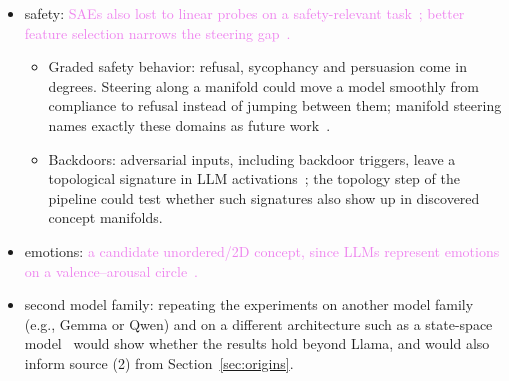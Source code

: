 \documentclass[11pt,a4paper]{article}
\newcommand{\todo}[1]{\textbf{\textcolor{red}{[TODO: #1]}}}
\newcommand{\fromold}[1]{\textcolor{violet}{#1}}
\newcommand{\fromclaude}[1]{\textcolor{orange!85!black}{#1}}
\newcommand{\todo}[1]{\ifhmode\unskip\fi} %
\newcommand{\fromold}[1]{#1}
\newcommand{\fromclaude}[1]{#1}
\begin{document}
\begin{itemize}
  \item safety: \fromold{SAEs also lost to linear probes on a safety-relevant task~\cite{gdm2025negative}; better feature selection narrows the steering gap~\cite{arad2025steering}.}
  \begin{itemize}
    \item \fromclaude{Graded safety behavior: refusal, sycophancy and persuasion come in degrees. Steering along a manifold could move a model smoothly from compliance to refusal instead of jumping between them; manifold steering names exactly these domains as future work~\cite{wurgaft2026manifoldsteering}.}
    \item \fromclaude{Backdoors: adversarial inputs, including backdoor triggers, leave a topological signature in LLM activations~\cite{fay2026shape}; the topology step of the pipeline could test whether such signatures also show up in discovered concept manifolds.}
  \end{itemize}
  \item emotions: \fromold{a candidate unordered/2D concept, since LLMs represent emotions on a valence--arousal circle~\cite{sun2026valence}.}
  \item second model family: \fromclaude{repeating the experiments on another model family (e.g., Gemma or Qwen) and on a different architecture such as a state-space model~\cite{gu2023mamba} would show whether the results hold beyond Llama, and would also inform source (2) from Section~\ref{sec:origins}.}
\end{itemize}

\printbibliography[heading=bibintoc,title={References}]
\end{document}
